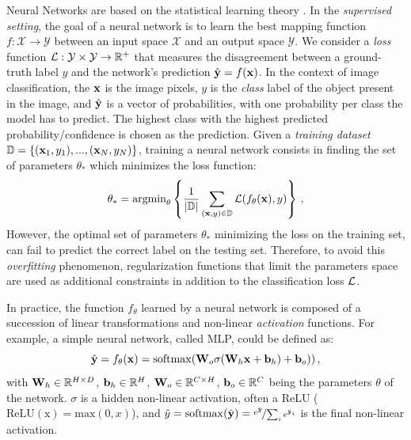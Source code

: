 Neural Networks are based on the statistical learning theory \citep{vapnik1999statstheory}. In the
\textit{supervised setting}, the goal of a neural network is to learn the best mapping function $f :
      \mathcal{X} \rightarrow \mathcal{Y}$ between an input space $\mathcal{X}$ and an output space
$\mathcal{Y}$.  We consider a \textit{loss} function $\mathcal{L} : \mathcal{Y} \times \mathcal{Y} \rightarrow
      \mathbb{R}^+$ that measures the disagreement between a ground-truth label $y$ and the network's
prediction $\hat{\mathbf{y}} = f(\mathbf{x})$. In the context of image classification, the $\mathbf{x}$ is the image
pixels, $y$ is the \textit{class} label of the object present in the image, and $\hat{\mathbf{y}}$ is a
vector of probabilities, with one probability per class the model has to predict. The highest class
with the highest predicted probability/confidence is chosen as the prediction.
Given a \textit{training dataset} $\mathbb{D} = \{(\mathbf{x}_1, y_1), ..., (\mathbf{x}_N, y_N)\}$, training a neural network
consists in finding the set of parameters $\theta_*$ which minimizes the loss function:
%
\begin{equation}
      \theta_* = \operatorname{argmin}_{\theta} \left \{ \frac{1}{|\mathbb{D}|}\sum_{(\mathbf{x},y)\in \mathbb{D}} \mathcal{L}(f_\theta(\mathbf{x}), y)\right \}\,,
      \label{eq:intro_optim}
\end{equation}
%
However, the optimal set of parameters $\theta_*$ minimizing the loss on the training set, can fail
to predict the correct label on the testing set. Therefore, to avoid this \textit{overfitting}
phenomenon, regularization functions that limit the parameters space are used as additional
constraints in addition to the classification loss $\mathcal{L}$.

In practice, the function $f_\theta$ learned by a neural network is composed of a succession of linear
transformations and non-linear \textit{activation} functions. For example, a simple neural network,
called \ac{MLP}, could be defined as:
%
\begin{equation}
      \hat{\mathbf{y}} = f_\theta(\mathbf{x}) = \operatorname{softmax}(\mathbf{W}_o \sigma(\mathbf{W}_h \mathbf{x} + \mathbf{b}_h) + \mathbf{b}_o))\,,
      \label{eq:intro_mlp}
\end{equation}
%
\noindent with $\mathbf{W}_h \in \mathbb{R}^{H \times D}$, $\mathbf{b}_h \in \mathbb{R}^{H}$, $\mathbf{W}_o \in
      \mathbb{R}^{C \times H}$, $\mathbf{b}_o \in \mathbb{R}^{C}$ being the parameters $\theta$ of the
network. $\sigma$ is a hidden non-linear activation, often a \ac{ReLU}
($\operatorname{ReLU(x)} = \text{max}(0, x)$), and $\hat{y} = \operatorname{softmax}(\tilde{\mathbf{y}}) =
      \nicefrac{e^{\tilde{\mathbf{y}}}}{\sum_{i} e^{\tilde{\mathbf{y}}_i}}$ is the final non-linear activation.


